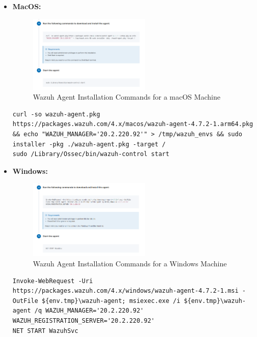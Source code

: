 \begin{itemize}
\begin{itemize}
    \item \textbf{MacOS:}
    \begin{figure}[H]
      \centering
      \includegraphics[width=0.55\textwidth]{images/setup/wazuh-agent-commands-mac.png}
      \caption{Wazuh Agent Installation Commands for a macOS Machine}
    \end{figure}
    \begin{verbatim}
curl -so wazuh-agent.pkg https://packages.wazuh.com/4.x/macos/wazuh-agent-4.7.2-1.arm64.pkg && echo "WAZUH_MANAGER='20.2.220.92'" > /tmp/wazuh_envs && sudo installer -pkg ./wazuh-agent.pkg -target /
sudo /Library/Ossec/bin/wazuh-control start
    \end{verbatim}

    \item \textbf{Windows:}
    \begin{figure}[H]
      \centering
      \includegraphics[width=0.55\textwidth]{images/setup/wazuh-agent-commands-win.png}
      \caption{Wazuh Agent Installation Commands for a Windows Machine}
    \end{figure}
    \begin{verbatim}
Invoke-WebRequest -Uri https://packages.wazuh.com/4.x/windows/wazuh-agent-4.7.2-1.msi -OutFile ${env.tmp}\wazuh-agent; msiexec.exe /i ${env.tmp}\wazuh-agent /q WAZUH_MANAGER='20.2.220.92' WAZUH_REGISTRATION_SERVER='20.2.220.92' 
NET START WazuhSvc
    \end{verbatim}
\end{itemize}

  \end{itemize}

